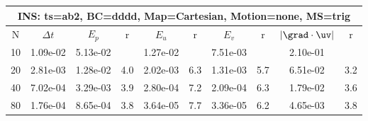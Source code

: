
\begin{tabular}{|c|c|c|c|c|c|c|c|c|c|} \hline
 \multicolumn{10}{|c|}{INS: ts=ab2, BC=dddd, Map=Cartesian, Motion=none, MS=trig } \\ \hline 
     N  &   $\Delta t$ & $E_p$   &  r  &   $E_u$   &   r    &   $E_v$   & r   &  $|\grad\cdot\uv|$  & r   \\ \hline 
  10   &  1.09e-02  &   5.13e-02  &        &   1.27e-02  &        &   7.51e-03  &        &   2.10e-01  &        \\ 
  20   &  2.81e-03  &   1.28e-02  & 4.0  &   2.02e-03  & 6.3  &   1.31e-03  & 5.7  &   6.51e-02  & 3.2  \\ 
  40   &  7.02e-04  &   3.29e-03  & 3.9  &   2.80e-04  & 7.2  &   2.09e-04  & 6.3  &   1.79e-02  & 3.6  \\ 
  80   &  1.76e-04  &   8.65e-04  & 3.8  &   3.64e-05  & 7.7  &   3.36e-05  & 6.2  &   4.65e-03  & 3.8  \\ 
 \hline 
\end{tabular}
